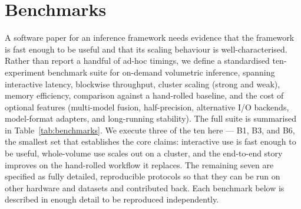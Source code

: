 \section{Benchmarks}
\label{sec:benchmarks}

A software paper for an inference framework needs evidence that the framework is fast enough to be useful and that its scaling behaviour is well-characterised. Rather than report a handful of ad-hoc timings, we define a standardised ten-experiment benchmark suite for on-demand volumetric inference, spanning interactive latency, blockwise throughput, cluster scaling (strong and weak), memory efficiency, comparison against a hand-rolled baseline, and the cost of optional features (multi-model fusion, half-precision, alternative I/O backends, model-format adapters, and long-running stability). The full suite is summarised in Table~\ref{tab:benchmarks}. We execute three of the ten here --- B1, B3, and B6, the smallest set that establishes the core claims: interactive use is fast enough to be useful, whole-volume use scales out on a cluster, and the end-to-end story improves on the hand-rolled workflow it replaces. The remaining seven are specified as fully detailed, reproducible protocols so that they can be run on other hardware and datasets and contributed back. Each benchmark below is described in enough detail to be reproduced independently.

